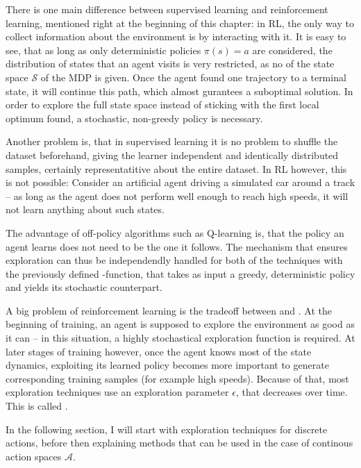 \label{sec:exploration}

There is one main difference between supervised learning and reinforcement learning, mentioned right at the beginning of this chapter: in RL, the only way to collect information about the environment is by interacting with it. It is easy to see, that as long as only deterministic policies $\pi(s) = a$ are considered, the distribution of states that an agent visits is very restricted, as no  of the state space $\mathcal{S}$ of the MDP is given. Once the agent found one trajectory to a terminal state, it will continue  this path, which almost gurantees a suboptimal solution. In order to explore the full state space instead of sticking with the first local optimum found, a stochastic, non-greedy policy is necessary.

Another problem is, that in supervised learning it is no problem to shuffle the dataset beforehand, giving the learner independent and identically distributed samples, certainly representatitive about the entire dataset. In RL however, this is not possible: Consider an artificial agent driving a simulated car around a track -- as long as the agent does not perform well enough to reach high speeds, it will not learn anything about such states. 

The advantage of off-policy algorithms such as Q-learning is, that the policy an agent learns does not need to be the one it follows. The mechanism that ensures exploration can thus be independendly handled for both of the techniques with the previously defined -function, that takes as input a greedy, deterministic policy and yields its stochastic counterpart.

A big problem of reinforcement learning is the tradeoff between  and . At the beginning of training, an agent is supposed to explore the environment as good as it can -- in this situation, a highly stochastical exploration function is required. At later stages of training however, once the agent knows most of the state dynamics, exploiting its learned policy becomes more important to generate corresponding training samples (for example high speeds). Because of that, most exploration techniques use an exploration parameter $\epsilon$, that decreases over time. This is called .

In the following section, I will start with exploration techniques for discrete actions, before then explaining methods that can be used in the case of continous action spaces $\mathcal{A}$.

